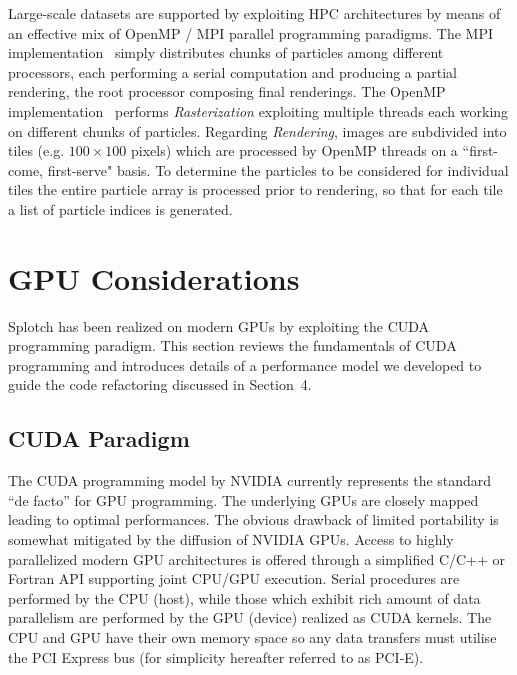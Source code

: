 \documentclass[1p]{elsarticle}
\begin{document}
Large-scale datasets are supported by exploiting HPC architectures by means of an effective mix of OpenMP / MPI parallel programming paradigms. The MPI implementation~\cite{jin:high-performance}  simply distributes chunks of particles among different processors, each performing a serial computation and producing a partial rendering, the root processor composing final renderings. The OpenMP implementation~\cite{Reinecke} performs {\it Rasterization} exploiting multiple threads each working on different chunks of particles. Regarding {\it Rendering}, images are subdivided into tiles (e.g. $100 \times 100$ pixels) which are processed by OpenMP threads on a ``first-come, first-serve" basis. To determine the particles to be considered for individual tiles the entire particle array is processed prior to rendering, so that for each tile a list of particle indices is generated.


\section{GPU Considerations}
\label{sec:gpu-code}

Splotch has been realized on modern GPUs by exploiting the CUDA programming paradigm. This section reviews the fundamentals of CUDA programming and introduces details of a performance model we developed to guide the code refactoring discussed in Section~4.  

\subsection{CUDA Paradigm} 
\label{sec:cuda}

The CUDA programming model \cite{cudaurl} by NVIDIA currently represents the standard ``de facto'' for GPU programming. The underlying GPUs are closely mapped leading to optimal performances. The obvious drawback of limited portability is somewhat mitigated by the diffusion of NVIDIA GPUs. Access to highly parallelized modern GPU architectures is offered through a simplified C/C++ or Fortran API supporting joint CPU/GPU execution. Serial procedures are performed by the CPU (host), while those which exhibit rich amount of data parallelism are performed by the GPU (device) realized as CUDA kernels. The CPU and GPU have their own memory space so any data transfers must utilise the PCI Express bus (for simplicity hereafter referred to as PCI-E). 
\end{document}
